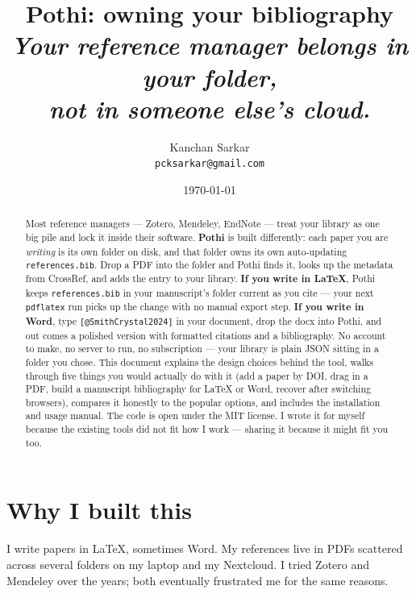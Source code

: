 \documentclass[11pt]{article}
\title{\textbf{\LARGE Pothi: owning your bibliography} \\[0.5em]
       \large \textit{Your reference manager belongs in your folder, \\
                      not in someone else's cloud.}}
\author{Kanchan Sarkar \\[0.3em]
        \small \texttt{pcksarkar@gmail.com}}
\date{\today}
\begin{document}
\maketitle

\begin{abstract}
Most reference managers --- Zotero, Mendeley, EndNote --- treat your library as
one big pile and lock it inside their software. \textbf{Pothi} is built
differently: each paper you are \emph{writing} is its own folder on disk, and
that folder owns its own auto-updating \texttt{references.bib}. Drop a PDF
into the folder and Pothi finds it, looks up the metadata from CrossRef, and
adds the entry to your library. \textbf{If you write in LaTeX}, Pothi keeps
\texttt{references.bib} in your manuscript's folder current as you cite ---
your next \texttt{pdflatex} run picks up the change with no manual export
step. \textbf{If you write in Word}, type \texttt{[@SmithCrystal2024]} in
your document, drop the docx into Pothi, and out comes a polished version
with formatted citations and a bibliography. No account to make, no server
to run, no subscription --- your library is plain JSON sitting in a folder
you chose. This document explains the design choices behind the tool, walks
through five things you would actually do with it (add a paper by DOI, drag
in a PDF, build a manuscript bibliography for LaTeX or Word, recover after
switching browsers), compares it honestly to the popular options, and
includes the installation and usage manual. The code is open under the MIT
license. I wrote it for myself because the existing tools did not fit how I
work --- sharing it because it might fit you too.
\end{abstract}

\section{Why I built this}

I write papers in LaTeX, sometimes Word. My references live in PDFs
scattered across several folders on my laptop and my Nextcloud. I tried
Zotero and Mendeley over the years; both eventually frustrated me for
the same reasons.
\end{document}

